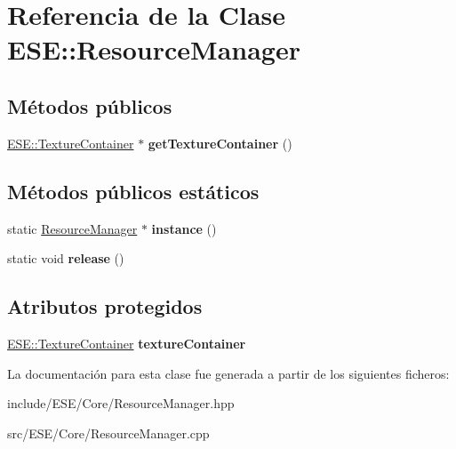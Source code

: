 \hypertarget{class_e_s_e_1_1_resource_manager}{\section{Referencia de la Clase E\-S\-E\-:\-:Resource\-Manager}
\label{class_e_s_e_1_1_resource_manager}
}
\subsection*{Métodos públicos}
\begin{DoxyCompactItemize}
\item 
\hypertarget{class_e_s_e_1_1_resource_manager_a6e85562647c3019c6fc962da20b19b39}{\hyperlink{class_e_s_e_1_1_texture_container}{E\-S\-E\-::\-Texture\-Container} $\ast$ {\bfseries get\-Texture\-Container} ()}\label{class_e_s_e_1_1_resource_manager_a6e85562647c3019c6fc962da20b19b39}

\end{DoxyCompactItemize}
\subsection*{Métodos públicos estáticos}
\begin{DoxyCompactItemize}
\item 
\hypertarget{class_e_s_e_1_1_resource_manager_ac4ef3febefc36ede251ea774a6c8450e}{static \hyperlink{class_e_s_e_1_1_resource_manager}{Resource\-Manager} $\ast$ {\bfseries instance} ()}\label{class_e_s_e_1_1_resource_manager_ac4ef3febefc36ede251ea774a6c8450e}

\item 
\hypertarget{class_e_s_e_1_1_resource_manager_a9bfdec5aa68922972490c313d38d9f80}{static void {\bfseries release} ()}\label{class_e_s_e_1_1_resource_manager_a9bfdec5aa68922972490c313d38d9f80}

\end{DoxyCompactItemize}
\subsection*{Atributos protegidos}
\begin{DoxyCompactItemize}
\item 
\hypertarget{class_e_s_e_1_1_resource_manager_a9c461d4def6d321a968fc6a230341222}{\hyperlink{class_e_s_e_1_1_texture_container}{E\-S\-E\-::\-Texture\-Container} {\bfseries texture\-Container}}\label{class_e_s_e_1_1_resource_manager_a9c461d4def6d321a968fc6a230341222}

\end{DoxyCompactItemize}


La documentación para esta clase fue generada a partir de los siguientes ficheros\-:\begin{DoxyCompactItemize}
\item 
include/\-E\-S\-E/\-Core/Resource\-Manager.\-hpp\item 
src/\-E\-S\-E/\-Core/Resource\-Manager.\-cpp\end{DoxyCompactItemize}
